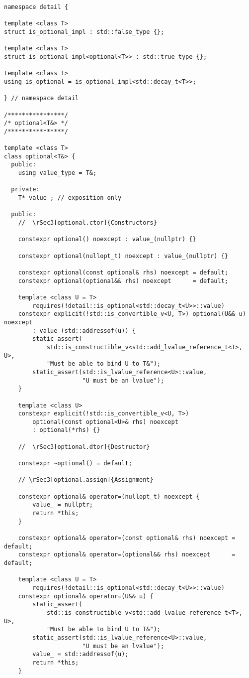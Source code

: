 \documentclass[a4paper,10pt,oneside,openany,final,article]{memoir}
\begin{document}
\begin{verbatim}
namespace detail {

template <class T>
struct is_optional_impl : std::false_type {};

template <class T>
struct is_optional_impl<optional<T>> : std::true_type {};

template <class T>
using is_optional = is_optional_impl<std::decay_t<T>>;

} // namespace detail

/****************/
/* optional<T&> */
/****************/

template <class T>
class optional<T&> {
  public:
    using value_type = T&;

  private:
    T* value_; // exposition only

  public:
    //  \rSec3[optional.ctor]{Constructors}

    constexpr optional() noexcept : value_(nullptr) {}

    constexpr optional(nullopt_t) noexcept : value_(nullptr) {}

    constexpr optional(const optional& rhs) noexcept = default;
    constexpr optional(optional&& rhs) noexcept      = default;

    template <class U = T>
        requires(!detail::is_optional<std::decay_t<U>>::value)
    constexpr explicit(!std::is_convertible_v<U, T>) optional(U&& u) noexcept
        : value_(std::addressof(u)) {
        static_assert(
            std::is_constructible_v<std::add_lvalue_reference_t<T>, U>,
            "Must be able to bind U to T&");
        static_assert(std::is_lvalue_reference<U>::value,
                      "U must be an lvalue");
    }

    template <class U>
    constexpr explicit(!std::is_convertible_v<U, T>)
        optional(const optional<U>& rhs) noexcept
        : optional(*rhs) {}

    //  \rSec3[optional.dtor]{Destructor}

    constexpr ~optional() = default;

    // \rSec3[optional.assign]{Assignment}

    constexpr optional& operator=(nullopt_t) noexcept {
        value_ = nullptr;
        return *this;
    }

    constexpr optional& operator=(const optional& rhs) noexcept = default;
    constexpr optional& operator=(optional&& rhs) noexcept      = default;

    template <class U = T>
        requires(!detail::is_optional<std::decay_t<U>>::value)
    constexpr optional& operator=(U&& u) {
        static_assert(
            std::is_constructible_v<std::add_lvalue_reference_t<T>, U>,
            "Must be able to bind U to T&");
        static_assert(std::is_lvalue_reference<U>::value,
                      "U must be an lvalue");
        value_ = std::addressof(u);
        return *this;
    }


\end{verbatim}
\end{document}
